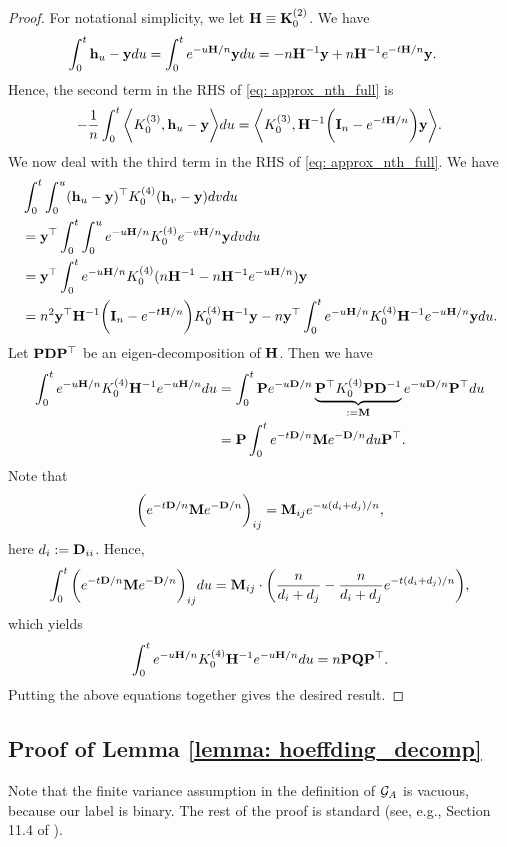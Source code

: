 \begin{proof}
For notational simplicity, we let ${\mathbf{H}} \equiv {{\mathbf{K}}}^{(2)}_0$.
We have
\begin{align*}
	\int_0^t {\mathbf{h}}_u - {\mathbf{y}} du & = \int_0^t e^{-u {\mathbf{H}}/n} {\mathbf{y}} du =  -n{\mathbf{H}}^{-1}{\mathbf{y}} + n{\mathbf{H}}^{-1}e^{-t{\mathbf{H}}/n}{\mathbf{y}}.
\end{align*}
Hence, the second term in the RHS of \eqref{eq: approx_nth_full} is
\begin{align*}
-\frac{1}{n} \int_{0}^t \bigg\langle {K}^{(3)}_0, {\mathbf{h}}_u-{\mathbf{y}} \bigg\rangle du= \bigg\langle {K}^{(3)}_0, {\mathbf{H}}^{-1}\bigg({\mathbf{I}}_n - e^{-t{\mathbf{H}}/n}\bigg) {\mathbf{y}} \bigg\rangle.
\end{align*}
We now deal with the third term in the RHS of \eqref{eq: approx_nth_full}. We have
\begin{align*}
& \int_0^t \int_0^u ({\mathbf{h}}_u - {\mathbf{y}})^\top {K}^{(4)}_0 ({\mathbf{h}}_v - {\mathbf{y}}) dvdu \\
	& = {\mathbf{y}}^\top \int_0^t\int_0^u e^{-u{\mathbf{H}}/n}  {K}^{(4)}_0 e^{-v{\mathbf{H}}/n} {\mathbf{y}} dvdu\\
	& = {\mathbf{y}}^\top \int_0^t e^{-u{\mathbf{H}}/n} {K}^{(4)}_0 (n{\mathbf{H}}^{-1} - n{\mathbf{H}}^{-1} e^{-u{\mathbf{H}}/n}) {\mathbf{y}} \\
	& = n^2{\mathbf{y}}^\top {\mathbf{H}}^{-1} \bigg({\mathbf{I}}_n - e^{-t{\mathbf{H}}/n} \bigg) {K}^{(4)}_0 {\mathbf{H}}^{-1} {\mathbf{y}} - n{\mathbf{y}}^\top \int_0^t e^{-u{\mathbf{H}}/n} {K}^{(4)}_0 {\mathbf{H}}^{-1}e^{-u{\mathbf{H}}/n} {\mathbf{y}} du.
\end{align*}
Let ${\mathbf{P}} {\mathbf{D}} {\mathbf{P}}^\top$ be an eigen-decomposition of ${\mathbf{H}}$. Then we have
\begin{align*}
	\int_0^t e^{-u{\mathbf{H}}/n} {K}^{(4)}_0 {\mathbf{H}}^{-1}e^{-u{\mathbf{H}}/n} du& = \int_0^t {\mathbf{P}} e^{-u{\mathbf{D}}/n} \underbrace{{\mathbf{P}}^\top {K}^{(4)}_0 {\mathbf{P}} {\mathbf{D}}^{-1}}_{:= {\mathbf{M}}} e^{-u{\mathbf{D}}/n} {\mathbf{P}}^\top du\\
	& = {\mathbf{P}} \int_0^t e^{-t{\mathbf{D}}/n} {\mathbf{M}} e^{-{\mathbf{D}}/n} du {\mathbf{P}}^\top.
\end{align*}
Note that
\[
	\bigg(e^{-t{\mathbf{D}}/n} {\mathbf{M}} e^{-{\mathbf{D}}/n}\bigg)_{ij}  = {\mathbf{M}}_{ij} e^{-u(d_i+d_j)/n},
\]
here $d_i : = {\mathbf{D}}_{ii}$. Hence, 
\[
	\int_0^t \bigg(e^{-t{\mathbf{D}}/n} {\mathbf{M}} e^{-{\mathbf{D}}/n}\bigg)_{ij} du = {\mathbf{M}}_{ij} \cdot \bigg(\frac{n}{d_i + d_j} - \frac{n}{d_i + d_j} e^{-t(d_i+d_j)/n}\bigg) ,
\]
which yields
\[
	\int_0^t e^{-u{\mathbf{H}}/n} {K}^{(4)}_0 {\mathbf{H}}^{-1}e^{-u{\mathbf{H}}/n} du = n{\mathbf{P}}  {\mathbf{Q}} {\mathbf{P}}^\top.
\]
Putting the above equations together gives the desired result.
\end{proof}

\subsection{Proof of Lemma \ref{lemma: hoeffding_decomp}}\label{subappend:proof_hoeffding_decomp}
Note that the finite variance assumption in the definition of ${\mathcal{G}}_A$ is vacuous, because our label is binary. The rest of the proof is standard (see, e.g., Section 11.4 of \citealt{van2000asymptotic}).




